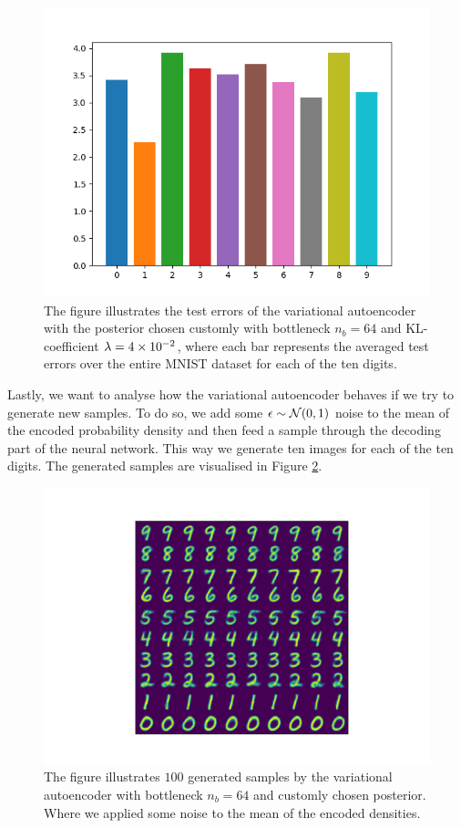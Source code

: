 \begin{figure}
\begin{center}
      \includegraphics[width=0.49\linewidth]{convolutional_VAE_new_idea_KL_4e-2_10k_epochs_64D_errors}
\end{center}
\caption{The figure illustrates the test errors of the variational autoencoder with the posterior chosen customly with bottleneck $n_b=64$ and KL-coefficient $\lambda = \num{4e-2}$, where each bar represents the averaged test errors over the entire MNIST dataset for each of the ten digits.}\label{fig:convolutional_VAE_new_idea_KL_4e-2_10k_epochs_64D_errors}
\end{figure}

Lastly, we want to analyse how the variational autoencoder behaves if we try to generate new samples. To do so, we add some $\operatorname{\epsilon}\sim \mathcal{N}(0,1)$ noise to the mean of the encoded probability density and then feed a sample through the decoding part of the neural network. This way we generate ten images for each of the ten digits. The generated samples are visualised in Figure \ref{fig:convolutional_VAE_better_generations_new_idea}.


\begin{figure}
\begin{center}
   \begin{minipage}[b]{0.60\linewidth}
      \includegraphics[trim = 15mm 10mm 15mm 10mm, clip, width=\linewidth]{convolutional_VAE_new_idea_KL_4e-2_10k_epochs_64D_generated_optimal}
	\end{minipage}
\end{center}
\caption{The figure illustrates $100$ generated samples by the variational autoencoder with bottleneck $n_b=64$ and customly chosen posterior. Where we applied some noise to the mean of the encoded densities.}\label{fig:convolutional_VAE_better_generations_new_idea}
\end{figure}

